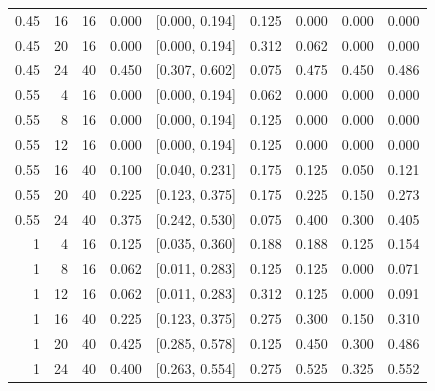 \begin{tabular}{rrrrccccc}
0.45 & 16 & 16 & 0.000 & [0.000, 0.194] & 0.125 & 0.000 & 0.000 & 0.000 \\
0.45 & 20 & 16 & 0.000 & [0.000, 0.194] & 0.312 & 0.062 & 0.000 & 0.000 \\
0.45 & 24 & 40 & 0.450 & [0.307, 0.602] & 0.075 & 0.475 & 0.450 & 0.486 \\
0.55 & 4 & 16 & 0.000 & [0.000, 0.194] & 0.062 & 0.000 & 0.000 & 0.000 \\
0.55 & 8 & 16 & 0.000 & [0.000, 0.194] & 0.125 & 0.000 & 0.000 & 0.000 \\
0.55 & 12 & 16 & 0.000 & [0.000, 0.194] & 0.125 & 0.000 & 0.000 & 0.000 \\
0.55 & 16 & 40 & 0.100 & [0.040, 0.231] & 0.175 & 0.125 & 0.050 & 0.121 \\
0.55 & 20 & 40 & 0.225 & [0.123, 0.375] & 0.175 & 0.225 & 0.150 & 0.273 \\
0.55 & 24 & 40 & 0.375 & [0.242, 0.530] & 0.075 & 0.400 & 0.300 & 0.405 \\
1 & 4 & 16 & 0.125 & [0.035, 0.360] & 0.188 & 0.188 & 0.125 & 0.154 \\
1 & 8 & 16 & 0.062 & [0.011, 0.283] & 0.125 & 0.125 & 0.000 & 0.071 \\
1 & 12 & 16 & 0.062 & [0.011, 0.283] & 0.312 & 0.125 & 0.000 & 0.091 \\
1 & 16 & 40 & 0.225 & [0.123, 0.375] & 0.275 & 0.300 & 0.150 & 0.310 \\
1 & 20 & 40 & 0.425 & [0.285, 0.578] & 0.125 & 0.450 & 0.300 & 0.486 \\
1 & 24 & 40 & 0.400 & [0.263, 0.554] & 0.275 & 0.525 & 0.325 & 0.552 \\
\bottomrule
\end{tabular}